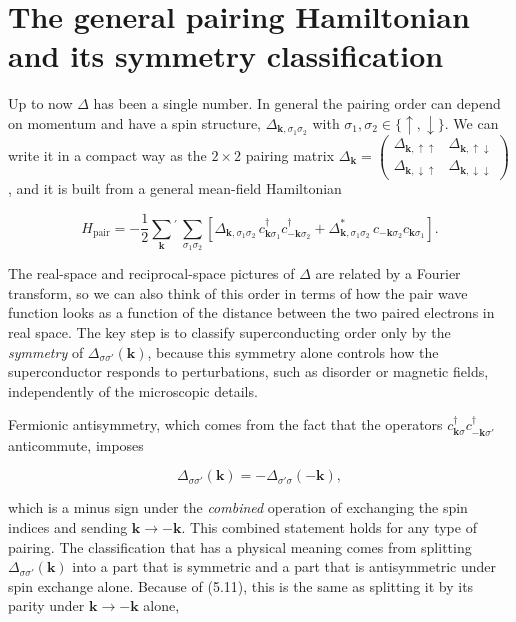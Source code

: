 \section{The general pairing Hamiltonian and its symmetry classification}

Up to now $\Delta$ has been a single number. In general the pairing order can depend on momentum and
have a spin structure, $\Delta_{\mathbf k,\sigma_1\sigma_2}$ with $\sigma_1,\sigma_2 \in
\{\uparrow,\downarrow\}$. We can write it in a compact way as the $2\times 2$ pairing matrix
$\Delta_{\mathbf
k} = \begin{pmatrix}\Delta_{\mathbf k,\uparrow\uparrow} & \Delta_{\mathbf k,\uparrow\downarrow}\\
\Delta_{\mathbf k,\downarrow\uparrow} & \Delta_{\mathbf k,\downarrow\downarrow}\end{pmatrix}$, and
it is built from a general mean-field Hamiltonian

\begin{equation}
H_{\text{pair}} = -\frac{1}{2}\sum_{\mathbf k}{}^{\prime}\, \sum_{\sigma_1\sigma_2} \left[\Delta_{\mathbf k,\sigma_1\sigma_2}\, c_{\mathbf k\sigma_1}^\dagger c_{-\mathbf k\sigma_2}^\dagger + \Delta_{\mathbf k,\sigma_1\sigma_2}^*\, c_{-\mathbf k\sigma_2} c_{\mathbf k\sigma_1}\right].
\end{equation}

The real-space and reciprocal-space pictures of $\Delta$ are related by a Fourier transform, so we
can also think of this order in terms of how the pair wave function looks as a function of the
distance between the two paired electrons in real space. The key step is to classify
superconducting order only by the \emph{symmetry} of $\Delta_{\sigma\sigma'}(\mathbf k)$, because
this symmetry alone controls how the superconductor responds to perturbations, such as disorder or
magnetic fields, independently of the microscopic details.

Fermionic antisymmetry, which comes from the fact that the operators $c_{\mathbf k\sigma}^\dagger
c_{-\mathbf k\sigma'}^\dagger$ anticommute, imposes

\begin{equation}
\Delta_{\sigma\sigma'}(\mathbf k) = -\Delta_{\sigma'\sigma}(-\mathbf k),
\end{equation}

which is a minus sign under the \emph{combined} operation of exchanging the spin indices and sending
$\mathbf k \to
-\mathbf k$. This combined statement holds for any type of pairing. The classification that has a
physical meaning comes from splitting $\Delta_{\sigma\sigma'}(\mathbf k)$ into a part that is
symmetric and a part that is antisymmetric under spin exchange alone. Because of (5.11), this is the
same as splitting it by its parity under $\mathbf k \to -\mathbf k$ alone,

